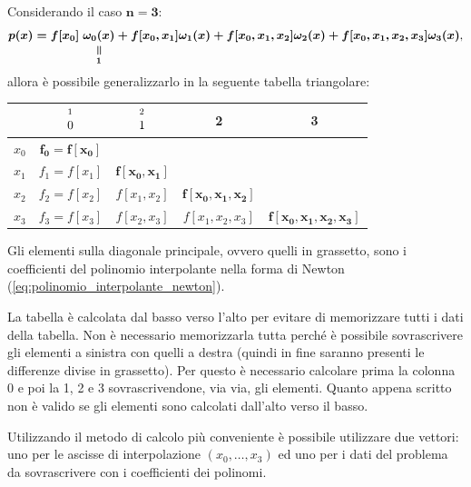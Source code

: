 \begin{example}
	Considerando il caso $\boldsymbol{n=3}$:
	\begin{equation*}
		\boldsymbol{p(x)=f[x_0]\;\equalto{\omega_0(x)}{1}+f[x_0,x_1]\omega_1(x)+f[x_0,x_1,x_2]\omega_2(x)+f[x_0,x_1,x_2,x_3]\omega_3(x)},
	\end{equation*}
	allora è possibile generalizzarlo in la seguente tabella triangolare:
	
	\begin{center}
		\begin{tabular}{|c|c|c|c|c|} 
			\hline
			& $\overset{\footnotemark}{0}$ & $\overset{\footnotemark}{1}$ & 2 & 3 \\
			\hline
			$x_0$ & $\boldsymbol{f_0 = f[x_0]}$ & & &  \\ 
			$x_1$ & $f_1 = f[x_1]$ & $\boldsymbol{f[x_0,x_1]}$ & &  \\ 
			$x_2$ & $f_2 = f[x_2]$ & $f[x_1,x_2]$ &$ \boldsymbol{f[x_0,x_1,x_2]}$ & \\
			$x_3$ & $f_3 = f[x_3]$ & $f[x_2, x_3]$ & $f[x_1,x_2,x_3]$ & $\boldsymbol{f[x_0,x_1,x_2,x_3]}$ \\
			\hline
		\end{tabular}
	\end{center}
	\addtocounter{footnote}{-1}
	
	
	Gli elementi sulla diagonale principale, ovvero quelli in grassetto, sono i coefficienti del polinomio interpolante nella forma di Newton (\ref{eq:polinomio_interpolante_newton}).
	
	La tabella è calcolata dal basso verso l'alto per evitare di memorizzare tutti i dati della tabella. Non è necessario memorizzarla tutta perché è possibile sovrascrivere gli elementi a sinistra con quelli a destra (quindi in fine saranno presenti le differenze divise in grassetto). Per questo è necessario calcolare prima la colonna 0 e poi la 1, 2 e 3 sovrascrivendone, via via, gli elementi. Quanto appena scritto non è valido se gli elementi sono calcolati dall'alto verso il basso.
	
	Utilizzando il metodo di calcolo più conveniente è possibile utilizzare due vettori: uno per le ascisse di interpolazione $(x_0,\hdots, x_3)$ ed uno per i dati del problema da sovrascrivere con i coefficienti dei polinomi.
	

\end{example}
